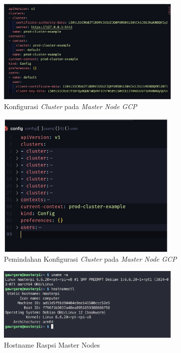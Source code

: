\begin{figure}[ht]
  \centering
  \includegraphics[width=0.8\textwidth]{resources/chapter-4/pengujian/kube-gcp-07.jpg}
  \caption{Konfigurasi \textit{Cluster} pada \textit{Master Node GCP}}
  \label{fig:konfigurasi-cluster-master-node-gcp}
\end{figure}

\begin{figure}[ht]
  \centering
  \includegraphics[width=0.8\textwidth]{resources/chapter-4/pengujian/kube-gcp-08.jpg}
  \caption{Pemindahan Konfigurasi \textit{Cluster} pada \textit{Master Node GCP}}
  \label{fig:proses-pemindahan-konfigurasi-master-gcp}
\end{figure}

\begin{figure}[ht]
  \centering
  \includegraphics[width=0.8\textwidth]{resources/chapter-4/pengujian/raspi-01.jpg}
  \caption{Hostname Raspsi Master Nodes}
  \label{fig:hostname-raspi-master-nodes}
\end{figure}

